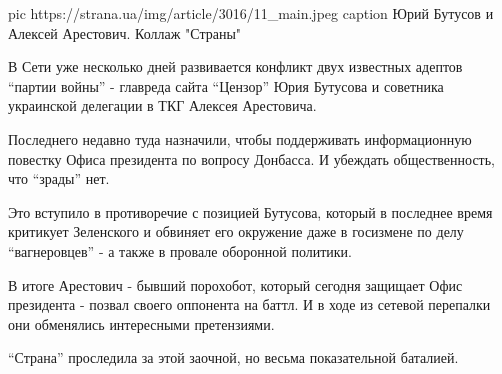  
 
 


\ifcmt
pic https://strana.ua/img/article/3016/11_main.jpeg
caption Юрий Бутусов и Алексей Арестович. Коллаж "Страны"
\fi

В Сети уже несколько дней развивается конфликт двух известных адептов
\enquote{партии войны} - главреда сайта \enquote{Цензор} Юрия Бутусова и советника
украинской делегации в ТКГ Алексея Арестовича.

Последнего недавно туда назначили, чтобы поддерживать информационную
повестку Офиса президента по вопросу Донбасса. И убеждать общественность,
что \enquote{зрады} нет. 

Это вступило в противоречие с позицией Бутусова, который в последнее время
критикует Зеленского и обвиняет его окружение даже в госизмене по делу
\enquote{вагнеровцев} - а также в провале оборонной политики.

В итоге Арестович - бывший порохобот, который сегодня защищает Офис
президента - позвал своего оппонента на баттл. И в ходе из сетевой
перепалки они обменялись интересными претензиями. 

\enquote{Страна} проследила за этой заочной, но весьма показательной баталией.

